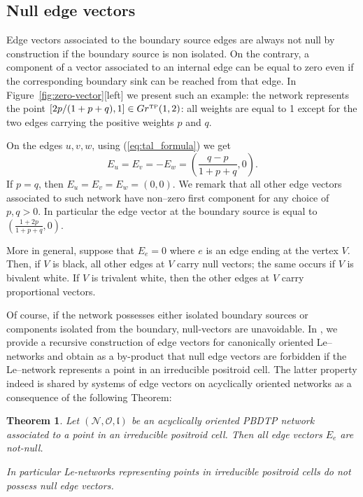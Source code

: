 \documentclass[11pt]{amsart}
\theoremstyle{plain}
\numberwithin{equation}{section}
\newtheorem{theorem}{Theorem}[subsection]
\begin{document}
\subsection{Null edge vectors}\label{sec:null_vectors}

Edge vectors associated to the boundary source edges are always not null by construction if the boundary source is non isolated. On the contrary, a component of a vector associated to an internal edge 
can be equal to zero even if the corresponding boundary sink can be reached from that edge. 
In Figure~\ref{fig:zero-vector}[left] we present such an example: the network represents the point $[ 2p/(1+p+q),1] \in Gr^{\mbox{\tiny TP}}(1,2)$: all weights are equal to 1 except for the two edges carrying the positive weights 
$p$ and $q$. 
\begin{figure}%
\end{figure}
On the edges $u,v,w$, using (\ref{eq:tal_formula}) we get
$$
E_u=E_v=-E_w=\left( \frac{q-p}{1+p+q}, 0\right).
$$
If $p=q$, then $E_u=E_v=E_w=(0,0)$. We remark that all other edge vectors associated to such network have non--zero first component for any choice of $p,q>0$. In particular the edge vector at the boundary source is equal to
$(\frac{1+2p}{1+p+q},0)$.

More in general, suppose that $E_e=0$ where $e$ is an edge ending at the vertex $V$. Then, if $V$ is black, all other edges at $V$ carry null vectors; the same occurs if $V$ is bivalent white. If $V$ is trivalent white, then the other edges at $V$ carry proportional vectors.

Of course, if the network possesses either isolated boundary sources or components isolated from the boundary, null-vectors are unavoidable. In \cite{AG3}, we provide a recursive construction of edge vectors for canonically oriented Le--networks and obtain as a by-product that null edge vectors are forbidden if the Le--network represents a point in an irreducible positroid cell. The latter property indeed is shared by systems of edge vectors on acyclically oriented networks as a consequence of the following Theorem:

\begin{theorem}
\label{thm:null_acyclic}
Let   $({\mathcal N}, {\mathcal O}, \mathfrak{l})$ be an acyclically oriented PBDTP network associated to a point in an irreducible positroid cell. Then all edge vectors $E_e$ are not-null.  

In particular Le-networks representing points in irreducible positroid cells do not possess null edge vectors.
\end{theorem}
\end{document}
